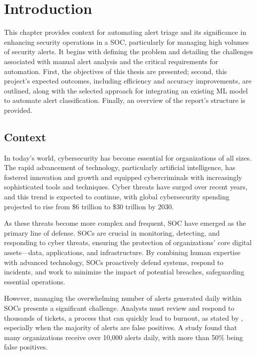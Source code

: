 \chapter{Introduction}
\label{chap:Chapter1}

This chapter provides context for automating alert triage and its significance in enhancing security operations in a SOC, particularly for managing high volumes of security alerts. It begins with defining the problem and detailing the challenges associated with manual alert analysis and the critical requirements for automation. First, the objectives of this thesis are presented; second, this project's expected outcomes, including efficiency and accuracy improvements, are outlined, along with the selected approach for integrating an existing ML model to automate alert classification. Finally, an overview of the report's structure is provided.

\section{Context}

In today's world, cybersecurity has become essential for organizations of all sizes. \parencite{Vielberth2020} The rapid advancement of technology, particularly artificial intelligence, has fostered innovation and growth and equipped cybercriminals with increasingly sophisticated tools and techniques. Cyber threats have surged over recent years, and this trend is expected to continue, with global cybersecurity spending projected to rise from \$6 trillion to \$30 trillion by 2030. \parencite{SOVILJ2020113577}

As these threats become more complex and frequent, \gls{SOC} have emerged as the primary line of defense. \gls{SOC}s are crucial in monitoring, detecting, and responding to cyber threats, ensuring the protection of organizations' core digital assets—data, applications, and infrastructure. By combining human expertise with advanced technology, \gls{SOC}s proactively defend systems, respond to incidents, and work to minimize the impact of potential breaches, safeguarding essential operations. \parencite{Jalalvand2024}

However, managing the overwhelming number of alerts generated daily within \gls{SOC}s presents a significant challenge. Analysts must review and respond to thousands of tickets, a process that can quickly lead to burnout, as stated by \textcite{Tines2023}, especially when the majority of alerts are false positives. A study found that many organizations receive over 10,000 alerts daily, with more than 50\% being false positives. \parencite{CriticalStart2019}

